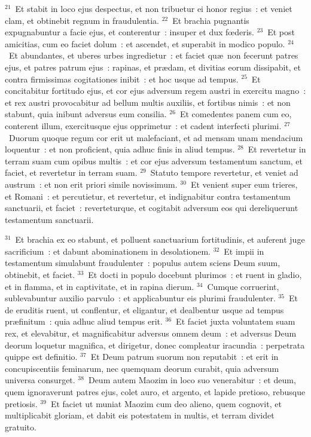 ${}^{21}$~Et stabit in loco ejus despectus, et non tribuetur ei honor regius~: et veniet clam, et obtinebit regnum in fraudulentia.
${}^{22}$~Et brachia pugnantis expugnabuntur a facie ejus, et conterentur~: insuper et dux fœderis.
${}^{23}$~Et post amicitias, cum eo faciet dolum~: et ascendet, et superabit in modico populo.
${}^{24}$~Et abundantes, et uberes urbes ingredietur~: et faciet qu\ae\ non fecerunt patres ejus, et patres patrum ejus~: rapinas, et pr\ae dam, et divitias eorum dissipabit, et contra firmissimas cogitationes inibit~: et hoc usque ad tempus.
${}^{25}$~Et concitabitur fortitudo ejus, et cor ejus adversum regem austri in exercitu magno~: et rex austri provocabitur ad bellum multis auxiliis, et fortibus nimis~: et non stabunt, quia inibunt adversus eum consilia.
${}^{26}$~Et comedentes panem cum eo, conterent illum, exercitusque ejus opprimetur~: et cadent interfecti plurimi.
${}^{27}$~Duorum quoque regum cor erit ut malefaciant, et ad mensam unam mendacium loquentur~: et non proficient, quia adhuc finis in aliud tempus.
${}^{28}$~Et revertetur in terram suam cum opibus multis~: et cor ejus adversum testamentum sanctum, et faciet, et revertetur in terram suam.
${}^{29}$~Statuto tempore revertetur, et veniet ad austrum~: et non erit priori simile novissimum.
${}^{30}$~Et venient super eum trieres, et Romani~: et percutietur, et revertetur, et indignabitur contra testamentum sanctuarii, et faciet~: reverteturque, et cogitabit adversum eos qui dereliquerunt testamentum sanctuarii.


${}^{31}$~Et brachia ex eo stabunt, et polluent sanctuarium fortitudinis, et auferent juge sacrificium~: et dabunt abominationem in desolationem.
${}^{32}$~Et impii in testamentum simulabunt fraudulenter~: populus autem sciens Deum suum, obtinebit, et faciet.
${}^{33}$~Et docti in populo docebunt plurimos~: et ruent in gladio, et in flamma, et in captivitate, et in rapina dierum.
${}^{34}$~Cumque corruerint, sublevabuntur auxilio parvulo~: et applicabuntur eis plurimi fraudulenter.
${}^{35}$~Et de eruditis ruent, ut conflentur, et eligantur, et dealbentur usque ad tempus pr\ae finitum~: quia adhuc aliud tempus erit.
${}^{36}$~Et faciet juxta voluntatem suam rex, et elevabitur, et magnificabitur adversus omnem deum~: et adversus Deum deorum loquetur magnifica, et dirigetur, donec compleatur iracundia~: perpetrata quippe est definitio.
${}^{37}$~Et Deum patrum suorum non reputabit~: et erit in concupiscentiis feminarum, nec quemquam deorum curabit, quia adversum universa consurget.
${}^{38}$~Deum autem Maozim in loco suo venerabitur~: et deum, quem ignoraverunt patres ejus, colet auro, et argento, et lapide pretioso, rebusque pretiosis.
${}^{39}$~Et faciet ut muniat Maozim cum deo alieno, quem cognovit, et multiplicabit gloriam, et dabit eis potestatem in multis, et terram dividet gratuito.


